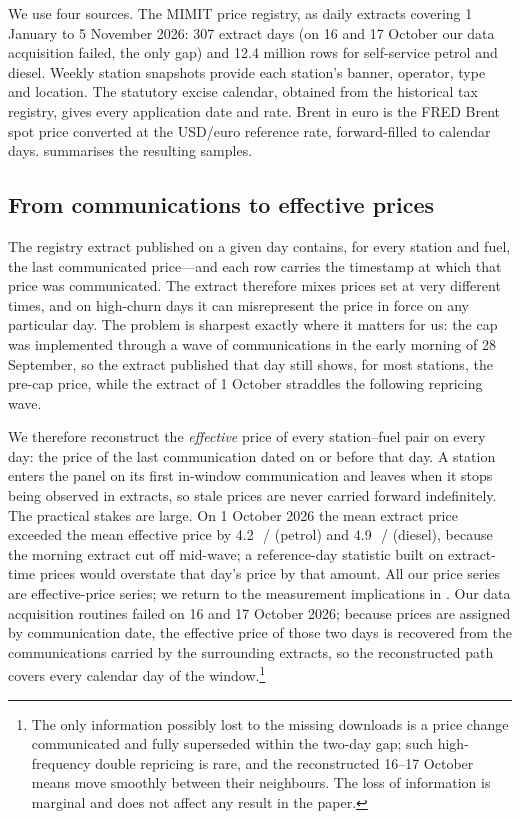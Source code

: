 \documentclass[11pt]{article}
\newcommand{\cl}{\,\text{c}/\text{l}}
\begin{document}
We use four sources. The MIMIT price registry, as daily extracts covering
1 January to 5 November 2026: 307 extract days (on 16 and 17 October our 
data acquisition failed, the only gap) and 12.4 million rows for self-service petrol and
diesel. Weekly station snapshots provide each station's banner, operator,
type and location. The statutory excise calendar, obtained from the
historical tax registry, gives every application date and
rate. Brent in euro is the FRED Brent spot price converted at the
USD/euro reference rate, forward-filled to calendar days.
 summarises the resulting samples.

\subsection{From communications to effective prices}

The registry extract published on a given day contains, for every station
and fuel, the last communicated price---and each row carries the timestamp
at which that price was communicated. The extract therefore mixes prices
set at very different times, and on high-churn days it can misrepresent
the price in force on any particular day. The problem is sharpest exactly
where it matters for us: the cap was implemented through a wave of
communications in the early morning of 28 September, so the extract
published that day still shows, for most stations, the pre-cap price,
while the extract of 1 October straddles the following repricing wave.

We therefore reconstruct the \emph{effective} price of every station--fuel
pair on every day: the price of the last communication dated on or before
that day. A station enters the panel on its first in-window communication
and leaves when it stops being observed in extracts, so stale prices are
never carried forward indefinitely. The practical stakes are large. On
1 October 2026 the mean extract price exceeded the mean effective price by
4.2~\cl{} (petrol) and 4.9~\cl{} (diesel), because the morning extract
cut off mid-wave; a reference-day statistic built on extract-time prices
would overstate that day's price by that amount. All our price series are
effective-price series; we return to the measurement implications in
. Our data acquisition routines failed on 16 and 17 October
2026; because prices are assigned by communication date, the effective
price of those two days is recovered from the communications carried by
the surrounding extracts, so the reconstructed path covers every calendar
day of the window.\footnote{The only information possibly lost to the
missing downloads is a price change communicated and fully superseded
within the two-day gap; such high-frequency double repricing is rare, and the
reconstructed 16--17 October means move smoothly between their
neighbours. The loss of information is marginal and does not affect any
result in the paper.}
\end{document}
